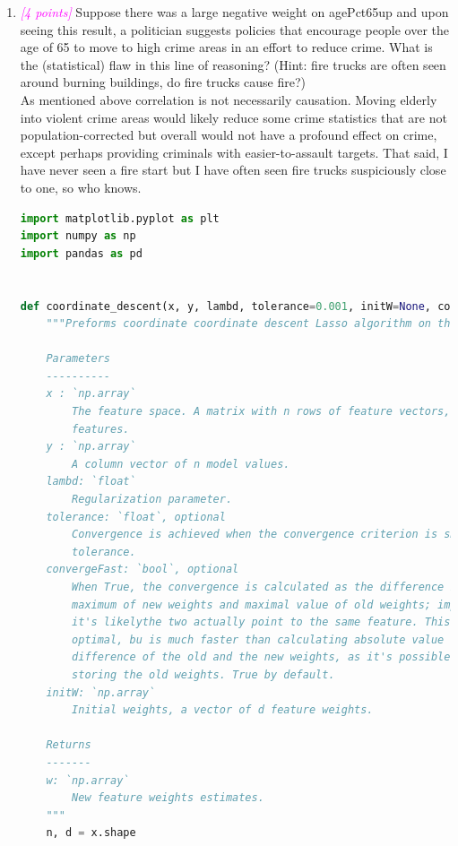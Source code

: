 \documentclass{article}
\newcommand{\1}{\mathbf{1}}
\newcommand{\points}[1]{\small\textcolor{magenta}{\emph{[#1 points]}} \normalsize}
\begin{document}
\begin{enumerate}
\begin{table}[h!]
\begin{tabular}{l|c}
        \end{tabular}{}
    \end{table}{}

    
    \item \points{4} Suppose there was a large negative weight on agePct65up and upon seeing this result, a politician suggests policies that encourage people over the age of 65 to move to high crime areas in an effort to reduce crime. What is the (statistical) flaw in this line of reasoning? (Hint:  fire trucks are often seen around burning buildings, do fire trucks cause fire?) \\
    As mentioned above correlation is not necessarily causation. Moving elderly into violent crime areas would likely reduce some crime statistics that are not population-corrected but overall would not have a profound effect on crime, except perhaps providing criminals with easier-to-assault targets. That said, I have never seen a fire start but I have often seen fire trucks suspiciously close to one, so who knows. 
    
    
\newpage
\begin{lstlisting}[language=Python]
import matplotlib.pyplot as plt
import numpy as np
import pandas as pd


def coordinate_descent(x, y, lambd, tolerance=0.001, initW=None, convergeFast=True):
    """Preforms coordinate coordinate descent Lasso algorithm on the given data.

    Parameters
    ----------
    x : `np.array`
        The feature space. A matrix with n rows of feature vectors, each with d
        features.
    y : `np.array`
        A column vector of n model values.
    lambd: `float`
        Regularization parameter.
    tolerance: `float`, optional
        Convergence is achieved when the convergence criterion is smaller than
        tolerance.
    convergeFast: `bool`, optional
        When True, the convergence is calculated as the difference between
        maximum of new weights and maximal value of old weights; implying that
        it's likelythe two actually point to the same feature. This is not
        optimal, bu is much faster than calculating absolute value of minimal
        difference of the old and the new weights, as it's possible to avoid
        storing the old weights. True by default.
    initW: `np.array`
        Initial weights, a vector of d feature weights.

    Returns
    -------
    w: `np.array`
        New feature weights estimates. 
    """
    n, d = x.shape


\end{lstlisting}
\end{enumerate}
\end{document}
